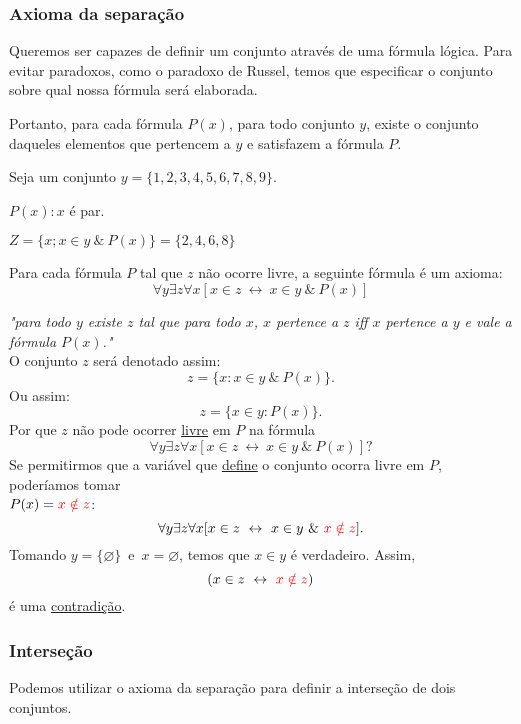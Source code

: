       \subsubsection{Axioma da separação}
         Queremos ser capazes de definir um conjunto através de uma fórmula lógica. Para evitar paradoxos, como o paradoxo de Russel, temos que especificar o conjunto sobre qual nossa fórmula será elaborada.
         \begin{stat}
            Portanto, para cada fórmula $P(x)$, para todo conjunto $y$, existe o conjunto daqueles elementos que pertencem a $y$ e satisfazem a fórmula $P$.
         \end{stat}
         \begin{exmp}
            Seja um conjunto $y = \{1,2,3,4,5,6,7,8,9\}$.

            $P(x): x$ é par.

            $Z = \{x; x \in y\ \&\ P(x)\} = \{2,4,6,8\}$
         \end{exmp}
         \begin{definition}
            Para cada fórmula $P$ tal que $z$ não ocorre livre, a seguinte fórmula é um axioma:
            $$\forall y \exists z \forall x [x \in z\ \leftrightarrow\ x \in y\ \&\ P(x)]$$    
         \end{definition}
         \textit{"para todo $y$ existe $z$ tal que para todo $x$, $x$ pertence a $z$ iff $x$ pertence a $y$ e vale a fórmula $P(x)$."}\\
         O conjunto $z$ será denotado assim:
         $$z = \{x: x \in y\ \&\ P(x)\}.$$
         Ou assim:
         $$z = \{x \in y: P(x)\}.$$
         Por que $z$ não pode ocorrer \underline{livre} em $P$ na fórmula
         $$\forall y \exists z \forall x [x \in z\ \leftrightarrow\ x \in y\ \&\ P(x)] ?$$
         Se permitirmos que a variável que \underline{define} o conjunto ocorra livre em $P$, poderíamos tomar \\ $P(x) = \color{red}{x \notin z}$:
         $$\forall y \exists z \forall x [x \in z\ \leftrightarrow\ x \in y\ \&\ \highl{x \notin z}\color{black}].$$
         Tomando $y = \{\varnothing\}$\ e\ $x = \varnothing$, temos que $x \in y$ é verdadeiro. Assim,
         $$(x \in z\ \leftrightarrow\ \highl{x \notin z} \color{black})$$
         é uma \underline{contradição}. 

      \subsubsection*{Interseção}
         Podemos utilizar o axioma da separação para definir a interseção de dois conjuntos.

